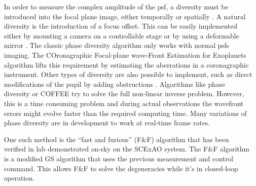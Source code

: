 \documentclass[letterpaper]{ar-1col}
\begin{document}
In order to measure the complex amplitude of the \ac{psf}, a diversity must be introduced into the focal plane image, either temporally or spatially \citep[see ][ for a review of these]{Fienup13,Gonsalves14}.
%
A natural diversity is the introduction of a focus offset.
%
This can be easily implemented either by mounting a camera on a controllable stage or by using a deformable mirror \citep{VanGorkom21DMs}.
%
The classic phase diversity algorithm only works with normal \acp{psf} imaging.
%
The COronagraphic Focal-plane wave-Front Estimation for Exoplanets \citep[COFFEE ;][]{Sauvage12,Paul13, herscovici2018experimental} algorithm lifts this requirement by estimating the aberrations in a coronagraphic instrument.
%
Other types of diversity are also possible to implement, such as direct modifications of the pupil by adding obstructions \citep{martinache2013asymmetric, brooks2016polarization, bos2019focal, gerard2023high}.
%
Algorithms like phase diversity or COFFEE try to solve the full non-linear inverse problem.
%
However, this is a time consuming problem and during actual observations the wavefront errors might evolve faster than the required computing time.
%
Many variations of phase diversity are in development to work at real-time frame rates. 

%
One such method is the ``fast and furious'' (F\&F) algorithm \citep{Keller12} that has been verified in lab \citep{Wilby18} demonstrated on-sky \citep{Bos20} on the SCExAO system.
%
The F\&F algorithm is a modified GS algorithm that uses the previous measurement and control command.
%
This allows F\&F to solve the degeneracies while it's in closed-loop operation.
\end{document}
